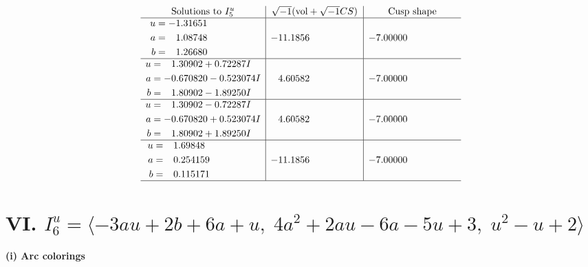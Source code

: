 \documentclass[1p]{elsarticle_modified}
\theoremstyle{definition}
\newcommand{\I}{\sqrt{-1}}
\begin{document}
$$\begin{array}{c|c|c}  
\text{Solutions to }I^u_{5}& \I (\text{vol} + \sqrt{-1}CS) & \text{Cusp shape}\\
 \hline 
\begin{aligned}
u &= -1.31651\phantom{ +0.000000I} \\
a &= \phantom{-}1.08748\phantom{ +0.000000I} \\
b &= \phantom{-}1.26680\phantom{ +0.000000I}\end{aligned}
 & -11.1856\phantom{ +0.000000I} & -7.00000\phantom{ +0.000000I} \\ \hline\begin{aligned}
u &= \phantom{-}1.30902 + 0.72287 I \\
a &= -0.670820 - 0.523074 I \\
b &= \phantom{-}1.80902 - 1.89250 I\end{aligned}
 & \phantom{-}4.60582\phantom{ +0.000000I} & -7.00000\phantom{ +0.000000I} \\ \hline\begin{aligned}
u &= \phantom{-}1.30902 - 0.72287 I \\
a &= -0.670820 + 0.523074 I \\
b &= \phantom{-}1.80902 + 1.89250 I\end{aligned}
 & \phantom{-}4.60582\phantom{ +0.000000I} & -7.00000\phantom{ +0.000000I} \\ \hline\begin{aligned}
u &= \phantom{-}1.69848\phantom{ +0.000000I} \\
a &= \phantom{-}0.254159\phantom{ +0.000000I} \\
b &= \phantom{-}0.115171\phantom{ +0.000000I}\end{aligned}
 & -11.1856\phantom{ +0.000000I} & -7.00000\phantom{ +0.000000I}\\
 \hline 
 \end{array}$$\newpage\newpage\renewcommand{\arraystretch}{1}
\centering \section*{VI. $I^u_{6}= \langle -3 a u+2 b+6 a+u,\;4 a^2+2 a u-6 a-5 u+3,\;u^2- u+2 \rangle$}
\flushleft \textbf{(i) Arc colorings}\\
\end{document}
